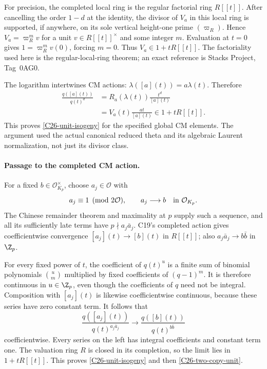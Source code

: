 \documentclass[11pt]{article}
\theoremstyle{definition}\newtheorem{definition}[theorem]{Definition}\newtheorem{remark}[theorem]{Remark}
\begin{document}
For precision, the completed local ring is the regular factorial
ring $R[[t]]$.  After cancelling the order $1-d$ at the identity,
the divisor of $V_a$ in this local ring is supported, if anywhere,
on its sole vertical height-one prime $(\varpi_R)$.
Hence $V_a=\varpi_R^m v$ for a unit
$v\in R[[t]]^{\times}$ and some integer $m$.
Evaluation at $t=0$ gives $1=\varpi_R^m v(0)$, forcing $m=0$.
Thus $V_a\in1+tR[[t]]$.
The factoriality used here is the regular-local-ring theorem;
an exact reference is Stacks Project, Tag~0AG0.

The logarithm intertwines CM actions:
$\lambda([a](t))=a\lambda(t)$.  Therefore
\begin{align*}
 \frac{q([a](t))}{q(t)^d}
 &=R_a(\lambda(t))\frac{t^d}{[a](t)}\\
 &=V_a(t)\frac{a t}{[a](t)}\in1+tR[[t]].
\end{align*}
This proves \eqref{C26-unit-isogeny} for the specified global
CM elements.  The argument used the actual canonical reduced
theta and its algebraic Laurent normalization, not just its
divisor class.

\paragraph{Passage to the completed CM action.}
For a fixed $b\in\mathcal O_{K_p}^{\times}$, choose
$a_j\in\mathcal O$ with
\[
 a_j\equiv1\pmod{2\mathcal O},\qquad
 a_j\longrightarrow b\quad\hbox{in }\mathcal O_{K_p}.
\]
The Chinese remainder theorem and maximality at $p$ supply
such a sequence, and all its sufficiently late terms have
$p\nmid a_j\bar a_j$.  C19's completed action gives
coefficientwise convergence $[a_j](t)\to[b](t)$ in $R[[t]]$;
also $a_j\bar a_j\to b\bar b$ in $\Z_p$.

For every fixed power of $t$, the coefficient of $q(t)^u$
is a finite sum of binomial polynomials $\binom{u}{m}$
multiplied by fixed coefficients of $(q-1)^m$.
It is therefore continuous in $u\in\Z_p$, even though the
coefficients of $q$ need not be integral.
Composition with $[a_j](t)$ is likewise coefficientwise
continuous, because these series have zero constant term.
It follows that
\[
 \frac{q([a_j](t))}{q(t)^{a_j\bar a_j}}
          \longrightarrow
 \frac{q([b](t))}{q(t)^{b\bar b}}
\]
coefficientwise.  Every series on the left has integral
coefficients and constant term one.  The valuation ring $R$
is closed in its completion, so the limit lies in
$1+tR[[t]]$.  This proves \eqref{C26-unit-isogeny} and
then \eqref{C26-two-copy-unit}.
\end{document}

